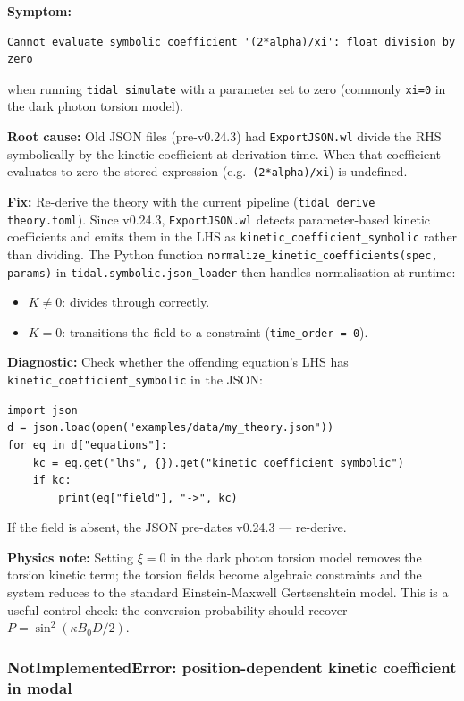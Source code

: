\textbf{Symptom:}
\begin{lstlisting}[style=python]
Cannot evaluate symbolic coefficient '(2*alpha)/xi': float division by zero
\end{lstlisting}
when running \texttt{tidal simulate} with a parameter set to
zero (commonly \texttt{xi=0} in the dark photon torsion model).

\textbf{Root cause:} Old JSON files (pre-v0.24.3) had \texttt{ExportJSON.wl} divide
the RHS symbolically by the kinetic coefficient at derivation time.  When that
coefficient evaluates to zero the stored expression (e.g.\ \texttt{(2*alpha)/xi}) is
undefined.

\textbf{Fix:} Re-derive the theory with the current pipeline
(\texttt{tidal derive theory.toml}).  Since v0.24.3, \texttt{ExportJSON.wl} detects
parameter-based kinetic coefficients and emits them in the LHS as
\texttt{kinetic\_coefficient\_symbolic} rather than dividing.  The Python function
\texttt{normalize\_kinetic\_coefficients(spec, params)} in
\texttt{tidal.symbolic.json\_loader} then handles normalisation at runtime:
\begin{itemize}
  \item $K \neq 0$: divides through correctly.
  \item $K = 0$: transitions the field to a constraint (\texttt{time\_order = 0}).
\end{itemize}

\textbf{Diagnostic:} Check whether the offending equation's LHS has
\texttt{kinetic\_coefficient\_symbolic} in the JSON:
\begin{lstlisting}[style=python]
import json
d = json.load(open("examples/data/my_theory.json"))
for eq in d["equations"]:
    kc = eq.get("lhs", {}).get("kinetic_coefficient_symbolic")
    if kc:
        print(eq["field"], "->", kc)
\end{lstlisting}
If the field is absent, the JSON pre-dates v0.24.3 --- re-derive.

\textbf{Physics note:} Setting $\xi = 0$ in the dark photon torsion model removes the
torsion kinetic term; the torsion fields become algebraic constraints and the system
reduces to the standard Einstein-Maxwell Gertsenshtein model.  This is a useful
control check: the conversion probability should recover $P = \sin^2(\kappa B_0 D/2)$.

\subsubsection{NotImplementedError: position-dependent kinetic coefficient in modal}
\label{sec:troubleshooting-posdep-kinetic-modal}

